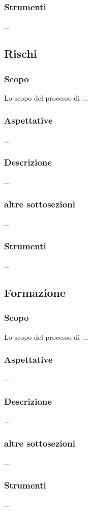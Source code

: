     \subsubsection{Strumenti}
    ...

\subsection{Rischi} %
    \subsubsection{Scopo}
    Lo scopo del processo di ...
    \subsubsection{Aspettative}
    ...
    \subsubsection{Descrizione}
    ...
    \subsubsection{altre sottosezioni}
    ...
    \subsubsection{Strumenti}
    ...

\subsection{Formazione} %
    \subsubsection{Scopo}
    Lo scopo del processo di ...
    \subsubsection{Aspettative}
    ...
    \subsubsection{Descrizione}
    ...
    \subsubsection{altre sottosezioni}
    ...
    \subsubsection{Strumenti}
    ...

